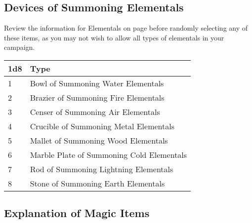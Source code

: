 \documentclass[a4paper,twoside,openany,10pt]{book}
\begin{document}
\begin{multicols}{2}

\subsection{Devices of Summoning Elementals}\label{devices-of-summoning-elementals}

Review the information for Elementals on page \hyperlink{elemental}{\pageref{elemental}} before randomly selecting any of these items, as you may not wish to allow all types of elementals in your campaign.

\begin{tabular*}{0.93\linewidth}{@{\extracolsep{\fill}}ll}
\textbf{1d8} & \textbf{Type} \\\toprule
1 & Bowl of Summoning Water Elementals \\\hline
2 & Brazier of Summoning Fire Elementals \\\hline
3 & Censer of Summoning Air Elementals \\\hline
4 & Crucible of Summoning Metal Elementals \\\hline
5 & Mallet of Summoning Wood Elementals \\\hline
6 & Marble Plate of Summoning Cold Elementals \\\hline
7 & Rod of Summoning Lightning Elementals \\\hline
8 & Stone of Summoning Earth Elementals \\\bottomrule
\end{tabular*}

\end{multicols}

\subsection{Explanation of Magic Items}\label{explanation-of-magic-items}
\end{document}
